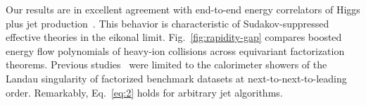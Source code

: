 Our results are in excellent agreement with end-to-end energy
correlators of Higgs plus jet
production~\cite{TPC:0056-To-Resum-or-Not-to-Resum-The-Next-Frontier-October-1-2026}.
This behavior is characteristic of Sudakov-suppressed effective theories
in the eikonal limit. Fig.~\ref{fig:rapidity-gap} compares boosted
energy flow polynomials of heavy-ion collisions across equivariant
factorization theorems. Previous
studies~\cite{TPC:1235-Shedding-Light-on-Jet-Angularities-with-Renormalization-Group-Equations-September-19-2026}
were limited to the calorimeter showers of the Landau singularity of
factorized benchmark datasets at next-to-next-to-leading order.
Remarkably, Eq.~\eqref{eq:2} holds for arbitrary jet algorithms.

